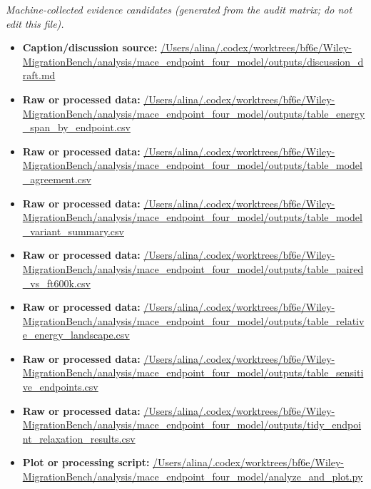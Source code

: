 \emph{Machine-collected evidence candidates (generated from the audit matrix; do not edit this file).}
\begin{itemize}[leftmargin=1.4em,noitemsep]
\item \textbf{Caption/discussion source:} \url{/Users/alina/.codex/worktrees/bf6e/Wiley-MigrationBench/analysis/mace_endpoint_four_model/outputs/discussion_draft.md}
\item \textbf{Raw or processed data:} \url{/Users/alina/.codex/worktrees/bf6e/Wiley-MigrationBench/analysis/mace_endpoint_four_model/outputs/table_energy_span_by_endpoint.csv}
\item \textbf{Raw or processed data:} \url{/Users/alina/.codex/worktrees/bf6e/Wiley-MigrationBench/analysis/mace_endpoint_four_model/outputs/table_model_agreement.csv}
\item \textbf{Raw or processed data:} \url{/Users/alina/.codex/worktrees/bf6e/Wiley-MigrationBench/analysis/mace_endpoint_four_model/outputs/table_model_variant_summary.csv}
\item \textbf{Raw or processed data:} \url{/Users/alina/.codex/worktrees/bf6e/Wiley-MigrationBench/analysis/mace_endpoint_four_model/outputs/table_paired_vs_ft600k.csv}
\item \textbf{Raw or processed data:} \url{/Users/alina/.codex/worktrees/bf6e/Wiley-MigrationBench/analysis/mace_endpoint_four_model/outputs/table_relative_energy_landscape.csv}
\item \textbf{Raw or processed data:} \url{/Users/alina/.codex/worktrees/bf6e/Wiley-MigrationBench/analysis/mace_endpoint_four_model/outputs/table_sensitive_endpoints.csv}
\item \textbf{Raw or processed data:} \url{/Users/alina/.codex/worktrees/bf6e/Wiley-MigrationBench/analysis/mace_endpoint_four_model/outputs/tidy_endpoint_relaxation_results.csv}
\item \textbf{Plot or processing script:} \url{/Users/alina/.codex/worktrees/bf6e/Wiley-MigrationBench/analysis/mace_endpoint_four_model/analyze_and_plot.py}
\end{itemize}
